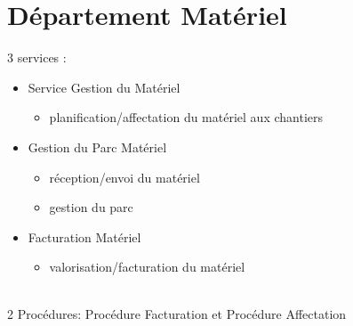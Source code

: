\documentclass [a4paper] {report}
\begin{document}
\section{Département Matériel}
3 services : \\
\begin{itemize}

\item	Service Gestion du Matériel\\
	\begin{itemize}
		\item	planification/affectation du matériel aux chantiers\\
	\end{itemize}
\item	Gestion du Parc Matériel \\
	\begin{itemize}
		\item réception/envoi du matériel\\
		\item gestion du parc\\
	\end{itemize}
\item	Facturation Matériel \\
	\begin{itemize}
		\item valorisation/facturation du matériel\\
	\end{itemize}		

\end{itemize}		
		
\hfill\\
	
2 Procédures: Procédure Facturation et Procédure Affectation\\\\
\end{document}
